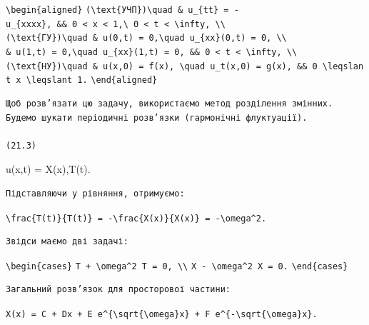 \documentclass[
  ukrainian,
]{article}
\begin{document}
\texttt{\textbackslash{}begin\{aligned\}}
\texttt{(\textbackslash{}text\{УЧП\})\textbackslash{}quad\ \&\ u\_\{tt\}\ =\ -u\_\{xxxx\},\ \&\&\ 0\ \textless{}\ x\ \textless{}\ 1,\textbackslash{}\ 0\ \textless{}\ t\ \textless{}\ \textbackslash{}infty,\ \textbackslash{}\textbackslash{}}
\texttt{(\textbackslash{}text\{ГУ\})\textbackslash{}quad\ \&\ u(0,t)\ =\ 0,\textbackslash{}quad\ u\_\{xx\}(0,t)\ =\ 0,\ \textbackslash{}\textbackslash{}}
\texttt{\&\ u(1,t)\ =\ 0,\textbackslash{}quad\ u\_\{xx\}(1,t)\ =\ 0,\ \&\&\ 0\ \textless{}\ t\ \textless{}\ \textbackslash{}infty,\ \textbackslash{}\textbackslash{}}
\texttt{(\textbackslash{}text\{НУ\})\textbackslash{}quad\ \&\ u(x,0)\ =\ f(x),\ \textbackslash{}quad\ u\_t(x,0)\ =\ g(x),\ \&\&\ 0\ \textbackslash{}leqslant\ x\ \textbackslash{}leqslant\ 1.}
\texttt{\textbackslash{}end\{aligned\}}

\begin{verbatim}
Щоб розв’язати цю задачу, використаємо метод розділення змінних. Будемо шукати періодичні розв’язки (гармонічні флуктуації).

(21.3)
\end{verbatim}

u(x,t) = X(x),T(t).

\begin{verbatim}
Підставляючи у рівняння, отримуємо:
\end{verbatim}

\texttt{\textbackslash{}frac\{T\textquotesingle{}\textquotesingle{}(t)\}\{T(t)\}\ =\ -\textbackslash{}frac\{X\textquotesingle{}\textquotesingle{}\textquotesingle{}\textquotesingle{}(x)\}\{X(x)\}\ =\ -\textbackslash{}omega\^{}2.}

\begin{verbatim}
Звідси маємо дві задачі:
\end{verbatim}

\texttt{\textbackslash{}begin\{cases\}}
\texttt{T\textquotesingle{}\textquotesingle{}\ +\ \textbackslash{}omega\^{}2\ T\ =\ 0,\ \textbackslash{}\textbackslash{}}
\texttt{X\textquotesingle{}\textquotesingle{}\textquotesingle{}\textquotesingle{}\ -\ \textbackslash{}omega\^{}2\ X\ =\ 0.}
\texttt{\textbackslash{}end\{cases\}}

\begin{verbatim}
Загальний розв’язок для просторової частини:
\end{verbatim}

\texttt{X(x)\ =\ C\ +\ Dx\ +\ E\ e\^{}\{\textbackslash{}sqrt\{\textbackslash{}omega\}x\}\ +\ F\ e\^{}\{-\textbackslash{}sqrt\{\textbackslash{}omega\}x\}.}
\end{document}
